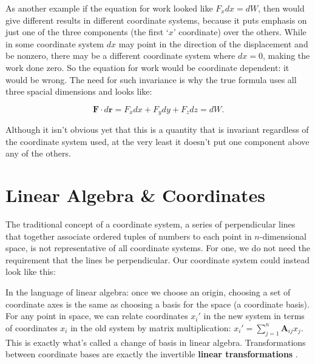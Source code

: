 \documentclass[../master.tex]{subfiles}
\begin{document}
	
	As another example if the equation for work looked like $F_x dx = dW$, then would give different results in different coordinate systems, because it puts emphasis on just one of the three components (the first `$x$' coordinate) over the others. While in some coordinate system $dx$ may point in the direction of the displacement and be nonzero, there may be a different coordinate system where $dx=0$, making the work done zero. So the equation for work would be coordinate dependent: it would be wrong. The need for such invariance is why the true formula uses all three spacial dimensions and looks like:
	
	\begin{equation*}
		\mathbf F \cdot  d \mathbf r = F_x dx + F_y dy + F_z dz = d W.
	\end{equation*}
	
	 Although it isn't obvious yet that this is a quantity that is invariant regardless of the coordinate system used, at the very least it doesn't put one component above any of the others.

	
	
	\section{Linear Algebra \& Coordinates} 
	\label{sec:Linear Algebra & Coordinates}%
	
	
	The traditional concept of a coordinate system, a series of perpendicular lines that together associate ordered tuples of numbers to each point in $n$-dimensional space, is not representative of all coordinate systems. For one, we do not need the requirement that the lines be perpendicular. Our coordinate system could instead look like this:
	
	
	In the language of linear algebra: once we choose an origin, choosing a set of coordinate axes is the same as choosing a basis for the space (a coordinate basis). For any point in space, we can relate coordinates $x_i'$ in the new system in terms of coordinates $x_i$ in the old system by matrix multiplication: $x_i' = \sum_{j=1}^n \mathbf A_{ij} x_j$. This is exactly what's called a change of basis in linear algebra. Transformations between coordinate bases are exactly the invertible \textbf{linear transformations} .
	
\end{document}
